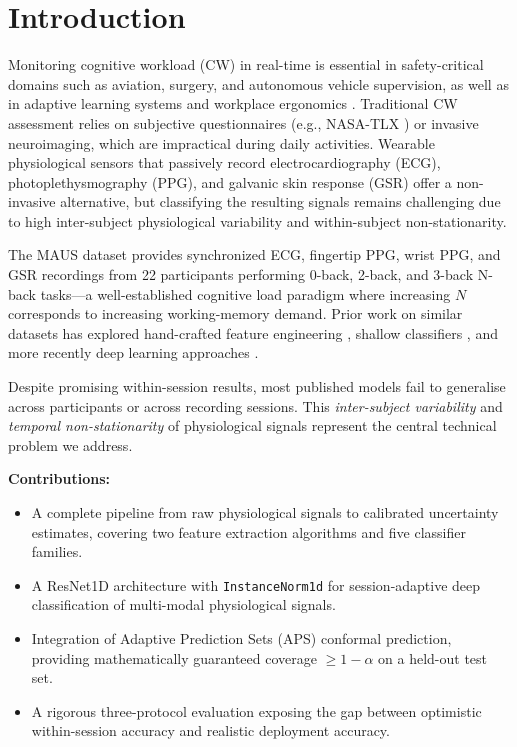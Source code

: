 \documentclass[conference]{IEEEtran}
\begin{document}
\section{Introduction}
\label{sec:intro}

Monitoring cognitive workload (CW) in real-time is essential in safety-critical domains such as aviation, surgery, and autonomous vehicle supervision, as well as in adaptive learning systems and workplace ergonomics \cite{strang2014ht}. Traditional CW assessment relies on subjective questionnaires (e.g., NASA-TLX \cite{hart1988development}) or invasive neuroimaging, which are impractical during daily activities. Wearable physiological sensors that passively record electrocardiography (ECG), photoplethysmography (PPG), and galvanic skin response (GSR) offer a non-invasive alternative, but classifying the resulting signals remains challenging due to high inter-subject physiological variability and within-subject non-stationarity.

The MAUS dataset \cite{maus2022} provides synchronized ECG, fingertip PPG, wrist PPG, and GSR recordings from 22 participants performing 0-back, 2-back, and 3-back N-back tasks---a well-established cognitive load paradigm where increasing $N$ corresponds to increasing working-memory demand. Prior work on similar datasets has explored hand-crafted feature engineering \cite{gjoreski2017monitoring}, shallow classifiers \cite{zander2016towards}, and more recently deep learning approaches \cite{zhang2019hierarchical}.

Despite promising within-session results, most published models fail to generalise across participants or across recording sessions. This \emph{inter-subject variability} and \emph{temporal non-stationarity} of physiological signals represent the central technical problem we address.

\noindent\textbf{Contributions:}
\begin{itemize}
    \item A complete pipeline from raw physiological signals to calibrated uncertainty estimates, covering two feature extraction algorithms and five classifier families.
    \item A ResNet1D architecture with \texttt{InstanceNorm1d} for session-adaptive deep classification of multi-modal physiological signals.
    \item Integration of Adaptive Prediction Sets (APS) conformal prediction, providing mathematically guaranteed coverage $\geq 1-\alpha$ on a held-out test set.
    \item A rigorous three-protocol evaluation exposing the gap between optimistic within-session accuracy and realistic deployment accuracy.
\end{itemize}
\end{document}
